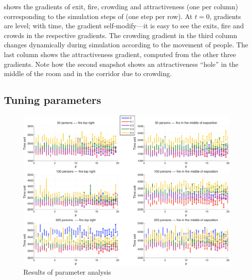 \documentclass[12pt,a4paper,twoside,openright]{book}
\begin{document}
 shows the gradients of exit, fire, crowding and attractiveness (one per column) corresponding to the simulation steps  of  (one step per row). At $t=0$, gradients are level; with time, the gradient self-modify---it is easy to see the exits, fire and crowds in the respective gradients. 
%
The crowding gradient in the third column  changes dynamically during simulation according to the movement of people.
%
The last column shows the attractiveness gradient, computed from the other three gradients. Note how the second snapshot shows an attractiveness ``hole'' in the middle of the room  and in the corridor due to crowding.

\subsection{Tuning parameters}

\begin{figure}
  \begin{center}
  \includegraphics[width=\columnwidth]{img/allcropped}
  \end{center}
  \caption{Results of parameter analysis}
  \label{fig:results}
\end{figure}
\end{document}
